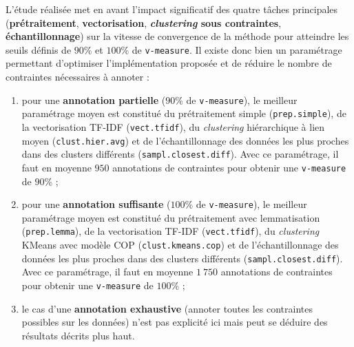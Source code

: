 			L'étude réalisée met en avant l'impact significatif des quatre tâches principales (\textbf{prétraitement}, \textbf{vectorisation}, \textbf{\textit{clustering} sous contraintes}, \textbf{échantillonnage}) sur la vitesse de convergence de la méthode pour atteindre les seuils définis de $90$\% et $100$\% de \texttt{v-measure}. Il existe donc bien un paramétrage permettant d'optimiser l'implémentation proposée et de réduire le nombre de contraintes nécessaires à annoter :
			\begin{enumerate}
				\item pour une \textbf{annotation partielle} ($90$\% de \texttt{v-measure}), le meilleur paramétrage moyen est constitué du prétraitement simple (\texttt{prep.simple}), de la vectorisation TF-IDF (\texttt{vect.tfidf}), du \textit{clustering} hiérarchique à lien moyen (\texttt{clust.hier.avg}) et de l'échantillonnage des données les plus proches dans des clusters différents (\texttt{sampl.closest.diff}).
				Avec ce paramétrage, il faut en moyenne $950$ annotations de contraintes pour obtenir une \texttt{v-measure} de $90$\% ;
				\item pour une \textbf{annotation suffisante} ($100$\% de \texttt{v-measure}), le meilleur paramétrage moyen est constitué du prétraitement avec lemmatisation (\texttt{prep.lemma}), de la vectorisation TF-IDF (\texttt{vect.tfidf}), du \textit{clustering} KMeans avec modèle COP (\texttt{clust.kmeans.cop}) et de l'échantillonnage des données les plus proches dans des clusters différents (\texttt{sampl.closest.diff}).
				Avec ce paramétrage, il faut en moyenne $1~750$ annotations de contraintes pour obtenir une \texttt{v-measure} de $100$\% ;
				\item le cas d'une \textbf{annotation exhaustive} (annoter toutes les contraintes possibles sur les données) n'est pas explicité ici mais peut se déduire des résultats décrits plus haut.
			\end{enumerate}
